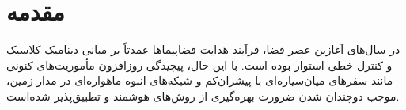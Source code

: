 \chapter{مقدمه}
\noindent 
در سال‌های آغازین عصر فضا، فرآیند هدایت فضاپیماها عمدتاً بر مبانی دینامیک کلاسیک و کنترل خطی استوار بوده است. با این حال، پیچیدگی روزافزون مأموریت‌های کنونی مانند سفرهای میان‌سیاره‌ای با پیشران‌کم و شبکه‌های انبوه ماهواره‌ای در مدار زمین، موجب دوچندان شدن ضرورت بهره‌گیری از روش‌های هوشمند و تطبیق‌پذیر شده‌است.






